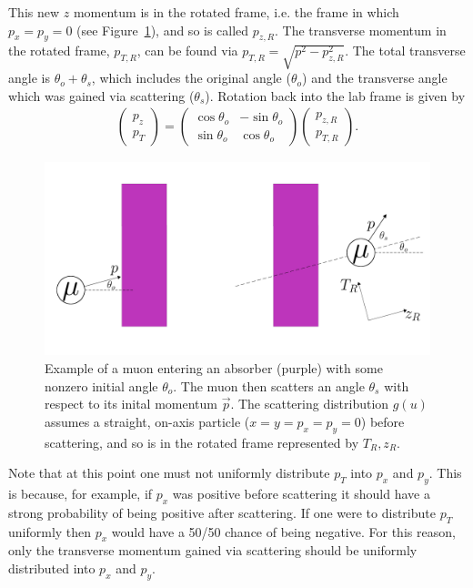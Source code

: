 This new $z$ momentum is in the rotated frame, i.e. the frame in which $p_x=p_y=0$ (see Figure~\ref{fig:cosyRotatedFrame}), and so is called $p_{z,R}$. The transverse momentum in the rotated frame, $p_{T,R}$, can be found via $p_{T,R}=\sqrt{p^2-p_{z,R}^2}$. The total transverse angle is $\theta_o + \theta_s$, which includes the original angle ($\theta_o$) and the transverse angle which was gained via scattering ($\theta_s$). Rotation back into the lab frame is given by
\begin{align*}
\begin{pmatrix}
p_{z} \\ p_T
\end{pmatrix}
=
\begin{pmatrix}
\cos\theta_o & -\sin\theta_o\\
\sin\theta_o & \cos\theta_o
\end{pmatrix}
\begin{pmatrix}
p_{z,R} \\ p_{T,R}
\end{pmatrix}.
\end{align*}

\begin{figure}
  \centering
    \includegraphics[width=\textwidth]{Figures/cosyRotatedFrame} 
  \caption[Example of a muon entering an absorber with some nonzero initial angle.]{Example of a muon entering an absorber (purple) with some nonzero initial angle $\theta_o$. The muon then scatters an angle $\theta_s$ with respect to its inital momentum $\vec{p}$. The scattering distribution $g(u)$ assumes a straight, on-axis particle ($x=y=p_x=p_y=0$) before scattering, and so is in the rotated frame represented by $T_R, z_R$.}
  \label{fig:cosyRotatedFrame}
\end{figure}

Note that at this point one must not uniformly distribute $p_T$ into $p_x$ and $p_y$. This is because, for example, if $p_x$ was positive before scattering it should have a strong probability of being positive after scattering. If one were to distribute $p_T$ uniformly then $p_x$ would have a 50/50 chance of being negative. For this reason, only the transverse momentum gained via scattering should be uniformly distributed into $p_x$ and $p_y$.

